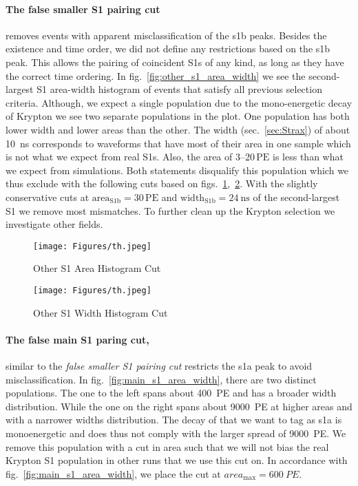\paragraph{The false smaller S1 pairing cut} removes events with apparent misclassification of the \gls{s1b} peaks.
Besides the existence and time order, we did not define any restrictions based on the \gls{s1b} peak.
This allows the pairing of coincident S1s of any kind, as long as they have the correct time ordering.
In fig.~\ref{fig:other_s1_area_width} we see the second-largest S1 area-width histogram of events that satisfy all previous selection criteria.
Although, we expect a single population due to the mono-energetic decay of Krypton we see two separate populations in the plot.
One population has both lower width and lower areas than the other.
The width (sec.~\ref{sec:Strax}) of about \SI{10}{\nano\s} corresponds to waveforms that have most of their area in one sample which is not what we expect from real S1s.
Also, the area of \numrange{3}{20}$\,\mathrm{PE}$ is less than what we expect from simulations.
Both statements disqualify this population which we thus exclude with the following cuts based on figs.~\ref{fig:other_s1_area_cut},~\ref{fig:other_s1_width_cut}.
With the slightly conservative cuts at $ \mathrm{area}_\mathrm{S1b} = 30\,\mathrm{PE}$ and $ \mathrm{width}_\mathrm{S1b} = \SI{24}{\nano\s} $ of the second-largest S1 we remove most mismatches.
To further clean up the Krypton selection we investigate other fields.


\begin{figure}[h]
\centering
\texttt{[image: Figures/th.jpeg]}  %
\caption[Other S1 Area Histogram Cut]{
        Other S1 Area Histogram Cut
    }
\label{fig:other_s1_area_cut}
\end{figure}


\begin{figure}
\centering
\texttt{[image: Figures/th.jpeg]}  %
\caption[Other S1 Width Histogram Cut]{
        Other S1 Width Histogram Cut
    }
\label{fig:other_s1_width_cut}
\end{figure}


\paragraph{The false main S1 paring cut,} similar to the \emph{false smaller S1 pairing cut} restricts the \gls{s1a} peak to avoid misclassification.
In fig.~\ref{fig:main_s1_area_width}, there are two distinct populations.
The one to the left spans about \SI{400}{PE} and has a broader width distribution.
While the one on the right spans about \SI{9000}{PE} at higher areas and with a narrower widths distribution.
The decay of  that we want to tag as \gls{s1a} is monoenergetic and does thus not comply with the larger spread of \SI{9000}{PE}.
We remove this population with a cut in area such that we will not bias the real Krypton S1 population in other runs that we use this cut on.
In accordance with fig.~\ref{fig:main_s1_area_width}, we place the cut at $ area_\mathrm{max} = \SI{600}{PE}$.

